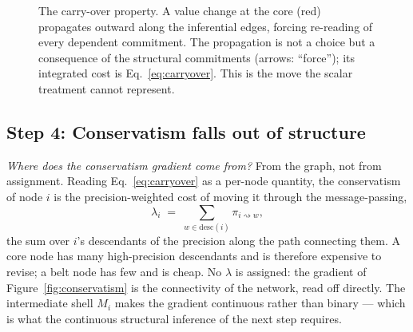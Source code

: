 \begin{figure}[t]
\caption{The carry-over property. A value change at the core (red)
propagates outward along the inferential edges, forcing re-reading of
every dependent commitment. The propagation is not a choice but a
consequence of the structural commitments (arrows: ``force''); its
integrated cost is Eq.~\eqref{eq:carryover}. This is the move the scalar
treatment cannot represent.}
\label{fig:carryover}
\end{figure}

\subsection{Step 4: Conservatism falls out of structure}
\label{ssec:conservatism}

\noindent\textit{Where does the conservatism gradient come from?} From
the graph, not from assignment. Reading Eq.~\eqref{eq:carryover} as a
per-node quantity, the conservatism of node $i$ is the precision-weighted
cost of moving it through the message-passing,
\begin{equation}
\lambda_i \;=\;\!\! \sum_{w \in \mathrm{desc}(i)}\!\! \pi_{i \rightsquigarrow w},
\label{eq:lambda}
\end{equation}
the sum over $i$'s descendants of the precision along the path
connecting them. A core node has many high-precision descendants and is
therefore expensive to revise; a belt node has few and is cheap. No
$\lambda$ is assigned: the gradient of Figure~\ref{fig:conservatism} is
the connectivity of the network, read off directly. The intermediate
shell $M_i$ makes the gradient continuous rather than binary --- which
is what the continuous structural inference of the next step requires.

